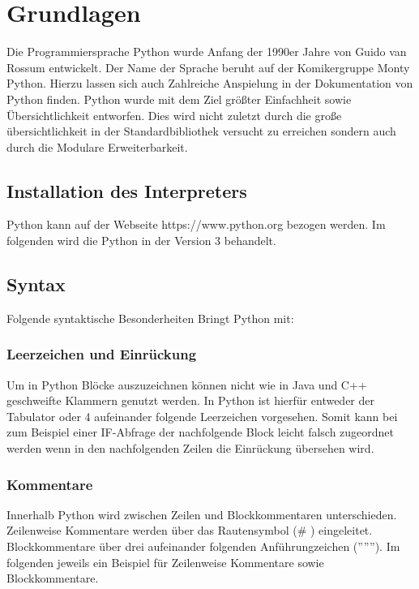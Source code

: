 
\section{Grundlagen}
Die Programmiersprache Python wurde Anfang der 1990er Jahre von Guido van Rossum entwickelt.
Der Name der Sprache beruht auf der Komikergruppe  Monty Python.
Hierzu lassen sich auch Zahlreiche Anspielung in der Dokumentation von Python finden.
Python wurde mit dem Ziel größter Einfachheit sowie Übersichtlichkeit entworfen.
Dies wird nicht zuletzt durch die große übersichtlichkeit in der Standardbibliothek versucht zu erreichen sondern auch durch die Modulare Erweiterbarkeit.


\subsection{Installation des Interpreters}
Python kann auf der Webseite https://www.python.org bezogen werden.
Im folgenden wird die Python in der Version 3 behandelt.





\subsection{Syntax}
Folgende syntaktische Besonderheiten Bringt Python mit:
\subsubsection{Leerzeichen und Einrückung}
Um in Python Blöcke auszuzeichnen können nicht wie in Java und C++ geschweifte Klammern genutzt werden. 
In Python ist hierfür entweder der Tabulator oder 4 aufeinander folgende Leerzeichen vorgesehen.
Somit kann bei zum Beispiel einer IF-Abfrage der nachfolgende Block leicht falsch zugeordnet werden wenn in den nachfolgenden Zeilen die Einrückung übersehen wird.
\subsubsection{Kommentare}
Innerhalb Python wird zwischen Zeilen und Blockkommentaren unterschieden.
Zeilenweise Kommentare werden über das Rautensymbol (\# ) eingeleitet.
Blockkommentare über drei aufeinander folgenden Anführungzeichen ('''''').
Im folgenden jeweils ein Beispiel für Zeilenweise Kommentare sowie Blockkommentare.

